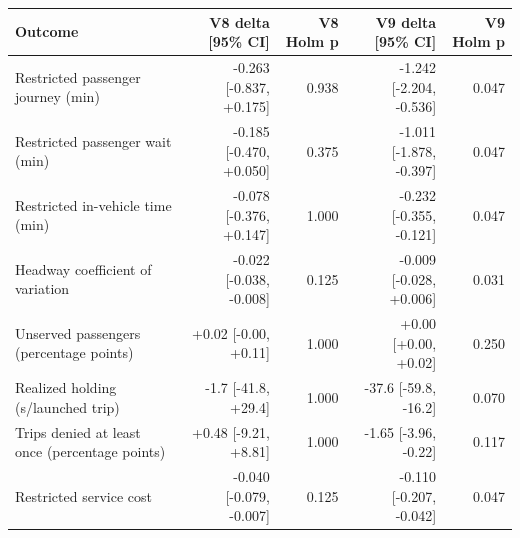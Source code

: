\begin{tabular}{lrrrr}
\toprule
Outcome & V8 delta [95\% CI] & V8 Holm p & V9 delta [95\% CI] & V9 Holm p \\
\midrule
Restricted passenger journey (min) & -0.263 [-0.837, +0.175] & 0.938 & -1.242 [-2.204, -0.536] & 0.047 \\
Restricted passenger wait (min) & -0.185 [-0.470, +0.050] & 0.375 & -1.011 [-1.878, -0.397] & 0.047 \\
Restricted in-vehicle time (min) & -0.078 [-0.376, +0.147] & 1.000 & -0.232 [-0.355, -0.121] & 0.047 \\
Headway coefficient of variation & -0.022 [-0.038, -0.008] & 0.125 & -0.009 [-0.028, +0.006] & 0.031 \\
Unserved passengers (percentage points) & +0.02 [-0.00, +0.11] & 1.000 & +0.00 [+0.00, +0.02] & 0.250 \\
Realized holding (s/launched trip) & -1.7 [-41.8, +29.4] & 1.000 & -37.6 [-59.8, -16.2] & 0.070 \\
Trips denied at least once (percentage points) & +0.48 [-9.21, +8.81] & 1.000 & -1.65 [-3.96, -0.22] & 0.117 \\
Restricted service cost & -0.040 [-0.079, -0.007] & 0.125 & -0.110 [-0.207, -0.042] & 0.047 \\
\bottomrule
\end{tabular}
